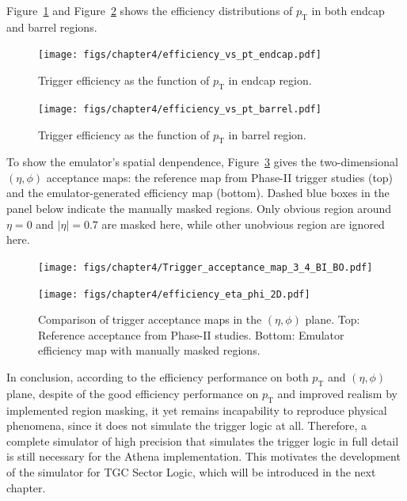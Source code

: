 Figure~\ref{fig:eff_pt_endcap} and Figure~\ref{fig:eff_pt_barrel} shows the efficiency distributions of $p_\mathrm{T}$ in both endcap and barrel regions.

\begin{figure}[htbp]
  \centering
  \texttt{[image: figs/chapter4/efficiency\_vs\_pt\_endcap.pdf]}
  \caption{Trigger efficiency as the function of $p_\mathrm{T}$ in endcap region.}
  \label{fig:eff_pt_endcap}
\end{figure}

\begin{figure}[htbp]
  \centering
  \texttt{[image: figs/chapter4/efficiency\_vs\_pt\_barrel.pdf]}
  \caption{Trigger efficiency as the function of $p_\mathrm{T}$ in barrel region.}
  \label{fig:eff_pt_barrel}
\end{figure}

To show the emulator's spatial denpendence, Figure~\ref{fig:eta_phi_comparison} gives the two-dimensional $(\eta, \phi)$ acceptance maps: the reference map from Phase-II trigger studies (top) and the emulator-generated efficiency map (bottom). Dashed blue boxes in the panel below indicate the manually masked regions. Only obvious region around $\eta = 0$ and $|\eta| = 0.7$ are masked here, while other unobvious region are ignored here.

\begin{figure}[htbp]
  \centering
  \texttt{[image: figs/chapter4/Trigger\_acceptance\_map\_3\_4\_BI\_BO.pdf]}
  \vspace{0.5em}
  
  \texttt{[image: figs/chapter4/efficiency\_eta\_phi\_2D.pdf]}
  
  \caption{Comparison of trigger acceptance maps in the $(\eta, \phi)$ plane. Top: Reference acceptance from Phase-II studies. Bottom: Emulator efficiency map with manually masked regions.}
  \label{fig:eta_phi_comparison}
\end{figure}

In conclusion, according to the efficiency performance on both $p_\mathrm{T}$ and $(\eta, \phi)$ plane, despite of the good efficiency performance on $p_\mathrm{T}$ and improved realism by implemented region masking, it yet remains incapability to reproduce physical phenomena, since it does not simulate the trigger logic at all. Therefore, a complete simulator of high precision that simulates the trigger logic in full detail is still necessary for the Athena implementation. This motivates the development of the simulator for TGC Sector Logic, which will be introduced in the next chapter.
